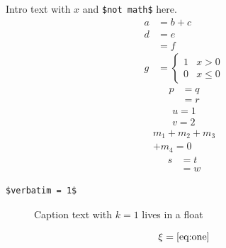 \documentclass{article}
\begin{document}
Intro text with $x$ and \verb|$not math$| here.
\begin{align}
  a &= b + c \label{l1}\\
  d &= e \nonumber \\
    &= f \label{l2}\\[2pt]
  g &= \begin{cases} 1 & x>0 \\ 0 & x \le 0 \end{cases}
\end{align}
\begin{align*}
  p &= q \\
  &= r
\end{align*}
\begin{gather}
  u = 1 \\
  v = 2
\end{gather}
\begin{multline}
  m_1 + m_2 + m_3 \\
  + m_4 = 0
\end{multline}
\begin{equation}
  \begin{split} s &= t \\ &= w \end{split}
\end{equation}
\begin{verbatim}
$verbatim = 1$
\end{verbatim}
\begin{figure}
\caption{Caption text with $k=1$ lives in a float}
\end{figure}
\begin{equation}\label{x}
\xi = \ref{eq:one}
\end{equation}
\end{document}
